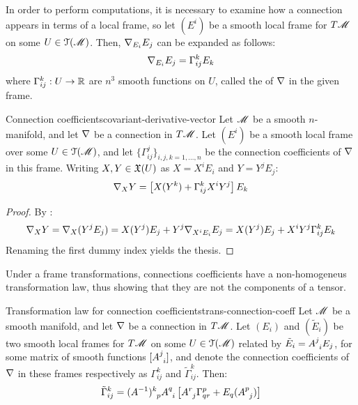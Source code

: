 In order to perform computations, it is necessary to examine how a connection appears in terms of a local frame, so let $ (E^i) $ be a smooth local frame for $ T\mathscr{M} $ on some $ U \in \EuScript{T}(\mathscr{M}) $. Then, $ \nabla_{E_i} E_j $ can be expanded as follows:
\begin{equation}
  \nabla_{E_i} E_j = \Gamma^k_{ij} E_k
  \label{eq:connection-coefficients}
\end{equation}
where $ \Gamma^k_{ij} : U \rightarrow \mathbb{R} $ are $ n^3 $ smooth functions on $ U $, called the  of $ \nabla $ in the given frame.

\begin{lemma}{Connection coefficients}{covariant-derivative-vector}
  Let $ \mathscr{M} $ be a smooth $ n $-manifold, and let $ \nabla $ be a connection in $ T\mathscr{M} $. Let $ (E^i) $ be a smooth local frame over some $ U \in \EuScript{T}(\mathscr{M}) $, and let $ \{\Gamma^j_{ij}\}_{i,j,k = 1 , \dots , n} $ be the connection coefficients of $ \nabla $ in this frame. Writing $ X , Y \in \mathfrak{X}(U) $ as $ X = X^i E_i $ and $ Y = Y^j E_j $:
  \begin{equation}
    \nabla_X Y = \left[ X(Y^k) + \Gamma^k_{ij} X^i Y^j \right] E_k
    \label{eq:covariant-derivative-vector}
  \end{equation}
\end{lemma}

\begin{proofbox}
  \begin{proof}
    By :
    \begin{equation*}
      \nabla_X Y = \nabla_X (Y^j E_j) = X(Y^j) E_j + Y^j \nabla_{X^i E_i} E_j = X(Y^j) E_j + X^i Y^j \Gamma^k_{ij} E_k
    \end{equation*}
    Renaming the first dummy index yields the thesis.
  \end{proof}
\end{proofbox}

Under a frame transformations, connections coefficients have a non-homogeneus transformation law, thus showing that they are not the components of a tensor.

\begin{proposition}{Transformation law for connection coefficients}{trans-connection-coeff}
  Let $ \mathscr{M} $ be a smooth manifold, and let $ \nabla $ be a connection in $ T\mathscr{M} $. Let $ (E_i) $ and $ (\tilde{E}_i) $ be two smooth local frames for $ T\mathscr{M} $ on some $ U \in \EuScript{T}(\mathscr{M}) $ related by $ \tilde{E}_i = \tensor{A}{^j_i} E_j $, for some matrix of smooth functions $ [\tensor{A}{^j_i}] $, and denote the connection coefficients of $ \nabla $ in these frames respectively as $ \Gamma^k_{ij} $ and $ \tilde{\Gamma}^k_{ij} $. Then:
  \begin{equation}
    \tilde{\Gamma}^k_{ij} = \tensor{(A^{-1})}{^k_p} \tensor{A}{^q_i} \left[ \tensor{A}{^r_j} \Gamma^p_{qr} + E_q(\tensor{A}{^p_j}) \right]
  \end{equation}
\end{proposition}

